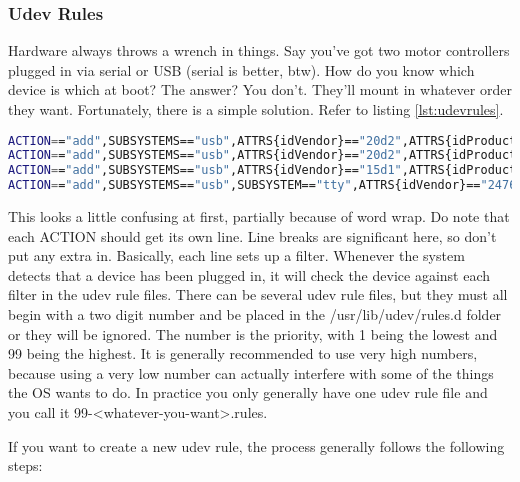 \subsubsection{Udev Rules}

Hardware always throws a wrench in things. Say you've got two motor controllers plugged in via serial or USB (serial is better, btw). How do you know which device is which at boot? The answer? You don't. They'll mount in whatever order they want. Fortunately, there is a simple solution. Refer to listing \ref{lst:udevrules}.

\begin{lstlisting}[language=bash,caption=99-smp2.rules,label=lst:udevrules,breaklines=true]
ACTION=="add",SUBSYSTEMS=="usb",ATTRS{idVendor}=="20d2",ATTRS{idProduct}=="5740",ATTRS{serial}=="498326853235",SYMLINK+="robot/left_motor_controller",MODE="0666"
ACTION=="add",SUBSYSTEMS=="usb",ATTRS{idVendor}=="20d2",ATTRS{idProduct}=="5740",ATTRS{serial}=="498626953235",SYMLINK+="robot/right_motor_controller",MODE="0666"
ACTION=="add",SUBSYSTEMS=="usb",ATTRS{idVendor}=="15d1",ATTRS{idProduct}=="0000",SYMLINK+="robot/lidar",MODE="0666"
ACTION=="add",SUBSYSTEMS=="usb",SUBSYSTEM=="tty",ATTRS{idVendor}=="2476",ATTRS{idProduct}=="1010",SYMLINK="robot/imu",MODE="0666"
\end{lstlisting}

This looks a little confusing at first, partially because of word wrap. Do note that each ACTION should get its own line. Line breaks are significant here, so don't put any extra in. Basically, each line sets up a filter. Whenever the system detects that a device has been plugged in, it will check the device against each filter in the udev rule files. There can be several udev rule files, but they must all begin with a two digit number and be placed in the /usr/lib/udev/rules.d folder or they will be ignored. The number is the priority, with 1 being the lowest and 99 being the highest. It is generally recommended to use very high numbers, because using a very low number can actually interfere with some of the things the OS wants to do. In practice you only generally have one udev rule file and you call it 99-<whatever-you-want>.rules.

If you want to create a new udev rule, the process generally follows the following steps:

